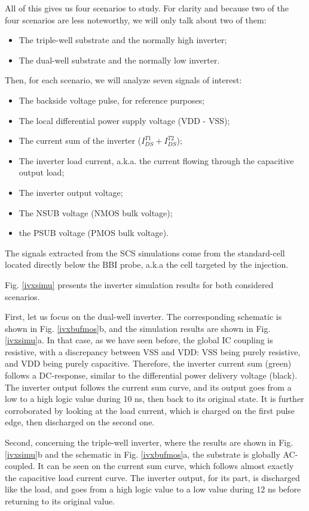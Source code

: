 	All of this gives us four scenarios to study.
	For clarity and because two of the four scenarios are less noteworthy, we will only talk about two of them:
	\begin{itemize}
		\item The triple-well substrate and the normally high inverter;
		\item The dual-well substrate and the normally low inverter.
	\end{itemize}
	Then, for each scenario, we will analyze seven signals of interest:
	\begin{itemize}
		\item The backside voltage pulse, for reference purposes;
		\item The local differential power supply voltage (VDD - VSS);
		\item The current sum of the inverter ($I_{DS}^{T1} + I_{DS}^{T2}$);
		\item The inverter load current, a.k.a. the current flowing through the capacitive output load;
		\item The inverter output voltage;
		\item The NSUB voltage (NMOS bulk voltage);
		\item the PSUB voltage (PMOS bulk voltage).
	\end{itemize}
	The signals extracted from the SCS simulations come from the standard-cell located directly below the BBI probe, a.k.a the cell targeted by the injection.
	
	Fig. \ref{ivxsimu} presents the inverter simulation results for both considered scenarios.

	First, let us focus on the dual-well inverter.
	The corresponding schematic is shown in Fig. \ref{ivxbufmos}b, and the simulation results are shown in Fig. \ref{ivxsimu}a.
	In that case, as we have seen before, the global IC coupling is resistive, with a discrepancy between VSS and VDD: VSS being purely resistive, and VDD being purely capacitive.
	Therefore, the inverter current sum (green) follows a DC-response, similar to the differential power delivery voltage (black).
	The inverter output follows the current sum curve, and its output goes from a low to a high logic value during 10 ns, then back to its original state.
	It is further corroborated by looking at the load current, which is charged on the first pulse edge, then discharged on the second one.

	Second, concerning the triple-well inverter, where the results are shown in Fig. \ref{ivxsimu}b and the schematic in Fig. \ref{ivxbufmos}a, the substrate is globally AC-coupled.
	It can be seen on the current sum curve, which follows almost exactly the capacitive load current curve.
	The inverter output, for its part, is discharged like the load, and goes from a high logic value to a low value during 12 ns before returning to its original value.

